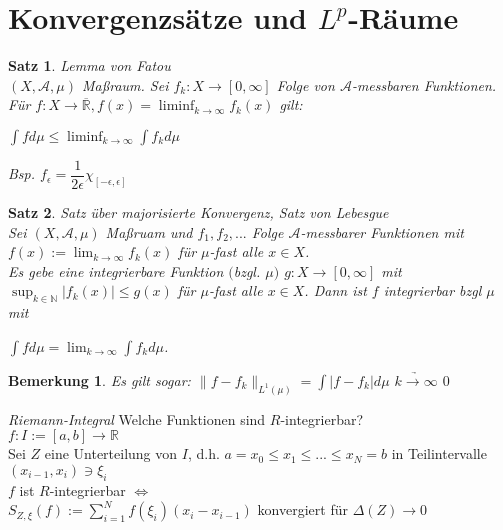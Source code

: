 \documentclass[11pt]{memoir}
\theoremstyle{changebreak}
\newtheorem{Bemerkung}{Bemerkung}[chapter]
\newtheorem{Satz}{Satz}[chapter]
\begin{document}
\section{Konvergenzsätze und $L^p$-Räume}

\begin{Satz}
\emph{Lemma von Fatou} \\
$(X, \mathscr A, \mu)$ Maßraum. Sei $f_k: X \rightarrow [0, \infty]$ Folge von $\mathscr A$-messbaren Funktionen. Für $f: X \rightarrow \overline{\mathbb R}, f(x) = \liminf_{k \rightarrow \infty} f_k (x)$ gilt: \\
\begin{center}
$\int f d\mu \leq \liminf_{k \rightarrow \infty} \int f_k d\mu$
\end{center}

Bsp. $f_\epsilon = \dfrac{1}{2\epsilon} \chi_{[-\epsilon, \epsilon]}$
\end{Satz}

\begin{Satz}
\emph{Satz über majorisierte Konvergenz, Satz von Lebesgue} \\
Sei $(X, \mathscr A, \mu)$ Maßruam und $f_1, f_2, ...$ Folge $\mathscr A$-messbarer Funktionen mit \\$f(x) := \lim_{k \rightarrow \infty} f_k (x)$ für $\mu$-fast alle $x \in X$. \\
Es gebe eine integrierbare Funktion $($bzgl. $\mu)$ $g: X \rightarrow [0, \infty]$ mit \\
$\sup_{k \in \mathbb N} |f_k (x)| \leq g(x)$ für $\mu$-fast alle $x \in X$. Dann ist $f$ integrierbar bzgl $\mu$ mit
\begin{center}
$\int f d\mu = \lim_{k \rightarrow \infty} \int f_k d\mu$.
\end{center}
\end{Satz}

\begin{Bemerkung}
Es gilt sogar: $\|f - f_k\|_{L^1(\mu)} = \int |f - f_k|d\mu$ $\underrightarrow{k \rightarrow \infty}$ $0$
\end{Bemerkung}

\emph{Riemann-Integral}
Welche Funktionen sind $R$-integrierbar? \\
$f: I:=[a, b] \rightarrow \mathbb R$ \\
Sei $Z$ eine Unterteilung von $I$, d.h. $a=x_0\leq x_1 \leq ... \leq x_N = b$ in Teilintervalle $(x_{i-1}, x_i) \ni \xi_i$ \\
$f$ ist $R$-integrierbar $\Leftrightarrow$ \\
$S_{Z, \xi} (f) := \sum\limits_{i=1}^N f(\xi_i)(x_i - x_{i-1})$ konvergiert für $\Delta(Z) \rightarrow 0$ \\
\end{document}
